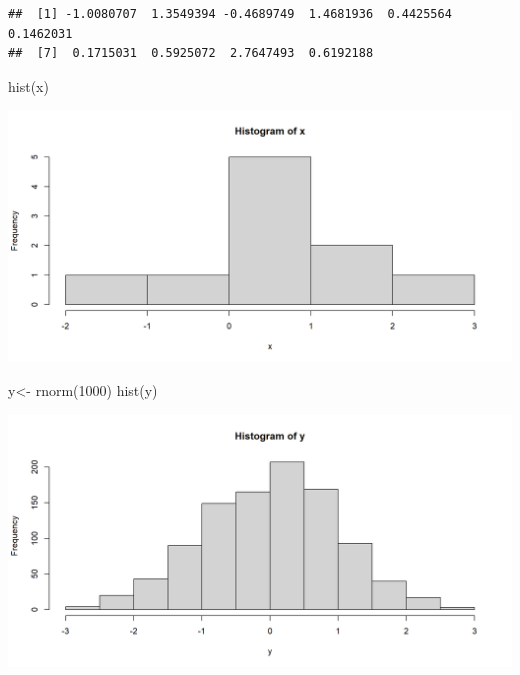 \documentclass[
]{book}
\newenvironment{Shaded}{\begin{snugshade}}{\end{snugshade}}
\newcommand{\DecValTok}[1]{\textcolor[rgb]{0.00,0.00,0.81}{#1}}
\newcommand{\FunctionTok}[1]{\textcolor[rgb]{0.00,0.00,0.00}{#1}}
\newcommand{\NormalTok}[1]{#1}
\newcommand{\OtherTok}[1]{\textcolor[rgb]{0.56,0.35,0.01}{#1}}
\begin{document}
\begin{verbatim}
##  [1] -1.0080707  1.3549394 -0.4689749  1.4681936  0.4425564  0.1462031
##  [7]  0.1715031  0.5925072  2.7647493  0.6192188
\end{verbatim}

\begin{Shaded}
\begin{Highlighting}[]
\FunctionTok{hist}\NormalTok{(x)}
\end{Highlighting}
\end{Shaded}

\begin{center}\includegraphics{figure/unnamed-chunk-18-1} \end{center}

\begin{Shaded}
\begin{Highlighting}[]
\NormalTok{y}\OtherTok{\textless{}{-}} \FunctionTok{rnorm}\NormalTok{(}\DecValTok{1000}\NormalTok{)}
\FunctionTok{hist}\NormalTok{(y)}
\end{Highlighting}
\end{Shaded}

\begin{center}\includegraphics{figure/unnamed-chunk-19-1} \end{center}
\end{document}
